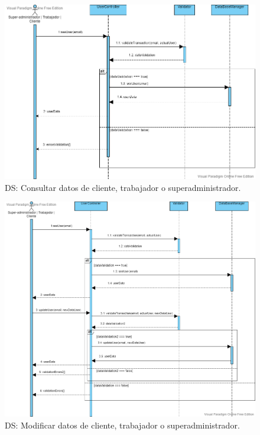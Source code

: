 \begin{figure}[H]
  \centering
  \includegraphics[scale=0.42]{images/Consultar_Datos_Usuario.png}
  \caption{DS: Consultar datos de cliente, trabajador o superadministrador.}
  \label{DS1}
\end{figure}

\begin{figure}[H]
  \centering
  \includegraphics[scale=0.38]{images/Modificar_Datos_Usuario.png}
  \caption{DS: Modificar datos de cliente, trabajador o superadministrador.}
  \label{DS1}
\end{figure}

